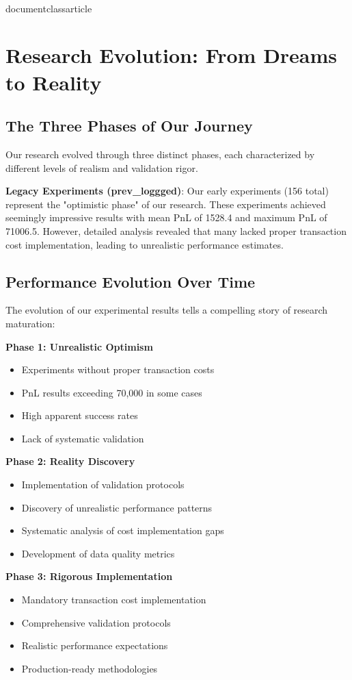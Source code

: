 \\documentclass{article}
\begin{document}
\section{Research Evolution: From Dreams to Reality}

\subsection{The Three Phases of Our Journey}

Our research evolved through three distinct phases, each characterized by different levels of realism and validation rigor.


\textbf{Legacy Experiments (prev\_loggged)}: Our early experiments (156 total) represent the "optimistic phase" of our research. These experiments achieved seemingly impressive results with mean PnL of 1528.4 and maximum PnL of 71006.5. However, detailed analysis revealed that many lacked proper transaction cost implementation, leading to unrealistic performance estimates.

\subsection{Performance Evolution Over Time}

The evolution of our experimental results tells a compelling story of research maturation:

\textbf{Phase 1: Unrealistic Optimism}
\begin{itemize}
\item Experiments without proper transaction costs
\item PnL results exceeding 70,000 in some cases
\item High apparent success rates
\item Lack of systematic validation
\end{itemize}

\textbf{Phase 2: Reality Discovery}
\begin{itemize}
\item Implementation of validation protocols
\item Discovery of unrealistic performance patterns
\item Systematic analysis of cost implementation gaps
\item Development of data quality metrics
\end{itemize}

\textbf{Phase 3: Rigorous Implementation}
\begin{itemize}
\item Mandatory transaction cost implementation
\item Comprehensive validation protocols
\item Realistic performance expectations
\item Production-ready methodologies
\end{itemize}
\end{document}
